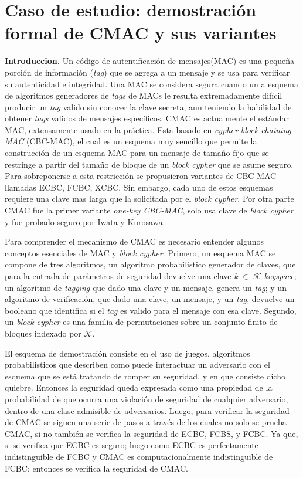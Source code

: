 \documentclass[runningheads]{llncs}
\begin{document}
\section{Caso de estudio: demostración formal de CMAC y sus variantes}
\textbf{Introduccion.} Un código de autentificación de mensajes(MAC) es una pequeña porción de información (\textit{tag}) que se agrega a un mensaje y se usa para verificar su autenticidad e integridad. Una MAC se considera segura cuando un a esquema de algoritmos generadores de \textit{tags} de MACs le resulta extremadamente difícil producir un \textit{tag} valido sin conocer la clave secreta, aun teniendo la habilidad de obtener \textit{tags} validos de mensajes específicos. CMAC es actualmente el estándar MAC, extensamente usado en la práctica. Esta basado en \textit{cypher block chaining MAC} (CBC-MAC), el cual es un esquema muy sencillo que permite la construcción de un esquema MAC para un mensaje de tamaño fijo que se restringe a partir del tamaño de bloque de un \textit{block cypher} que se asume seguro. Para sobreponerse a esta restricción se propusieron variantes de CBC-MAC llamadas ECBC, FCBC, XCBC. Sin embargo, cada uno de estos esquemas requiere una clave mas larga que la solicitada por el \textit{block cypher}. Por otra parte CMAC fue la primer variante \textit{one-key CBC-MAC}, solo usa clave de \textit{block cypher} y fue probado seguro por Iwata y Kurosawa.

Para comprender el mecanismo de CMAC es necesario entender algunos conceptos esenciales de MAC y \textit{block cypher}. Primero, un esquema MAC se compone de tres algoritmos, un algoritmo probabilistico generador de claves, que para la entrada de parámetros de seguridad devuelve una clave \textit{k} $\in$ $\mathcal{K}$ \textit{keyspace}; un algoritmo de \textit{tagging} que dado una clave y un mensaje, genera un \textit{tag}; y un algoritmo de verificación, que dado una clave, un mensaje, y un \textit{tag}, devuelve un booleano que identifica si el \textit{tag} es valido para el mensaje con esa clave. Segundo, un \textit{block cypher} es una familia de permutaciones sobre un conjunto finito de bloques indexado por $\mathcal{K}$.

El esquema de demostración consiste en el uso de juegos, algoritmos probabilisticos que describen como puede interactuar un adversario con el esquema que se está tratando de romper su seguridad, y en que consiste dicho quiebre. Entonces la seguridad queda expresada como una propiedad de la probabilidad de que ocurra una violación de seguridad de cualquier adversario, dentro de una clase admisible de adversarios. Luego, para verificar la seguridad de CMAC se siguen una serie de pasos a través de los cuales no solo se prueba CMAC, si no también se verifica la seguridad de ECBC, FCBS, y FCBC. Ya que, si se verifica que ECBC es seguro; luego como ECBC es perfectamente indistinguible de FCBC y CMAC es computacionalmente indistinguible de FCBC; entonces se verifica la seguridad de CMAC.
\end{document}
